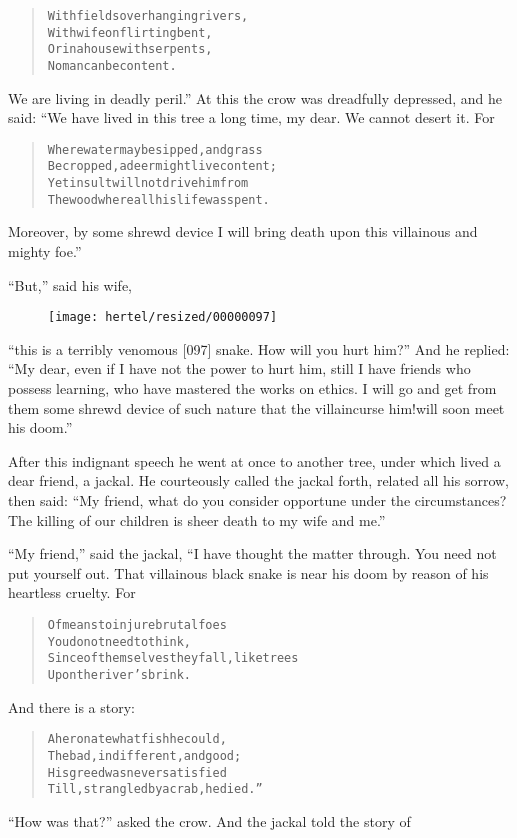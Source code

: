 \documentclass[article, twoside, 10pt]{memoir}
\renewenvironment{verbatim}{%
\begin{quote}%
\vskip -10pt%
\begin{alltt}\normalfont\small}{\end{alltt}%
\end{quote}%
\vskip -10pt
} %
\begin{document}
\begin{verbatim}
With fields overhanging rivers,
    With wife on flirting bent,
Or in a house with serpents,
    No man can be content.
\end{verbatim}
We are living in deadly peril.” At this the crow was dreadfully
depressed, and he said: “We have lived in this tree a long time, my
dear. We cannot desert it. For

\begin{verbatim}
Where water may be sipped, and grass
    Be cropped, a deer might live content;
Yet insult will not drive him from
    The wood where all his life was spent.
\end{verbatim}
Moreover, by some shrewd device I will bring death upon this
villainous and mighty foe.”

``But,'' said his wife,
\begin{figure}[p]\texttt{[image: hertel/resized/00000097]}\end{figure}``this is a terribly venomous [097] snake. How will you hurt him?''
And he replied:
``My dear, even if I have not the power to hurt him, still I have friends who possess learning, who have mastered the works on ethics. I will go and get from them some shrewd device of such nature that the villain{\textemdash}curse him!{\textemdash}will soon meet his doom.''

After this indignant speech he went at once to another tree, under
which lived a dear friend, a jackal. He courteously called the
jackal forth, related all his sorrow, then said:
``My friend, what do you consider opportune under the circumstances? The killing of our children is sheer death to my wife and me.''

``My friend,'' said the jackal, “I have thought the matter through.
You need not put yourself out. That villainous black snake is near
his doom by reason of his heartless cruelty. For

\begin{verbatim}
Of means to injure brutal foes
    You do not need to think,
Since of themselves they fall, like trees
    Upon the river's brink.
\end{verbatim}
And there is a story:

\begin{verbatim}
A heron ate what fish he could,
The bad, indifferent, and good;
His greed was never satisfied
Till, strangled by a crab, he died.”
\end{verbatim}
``How was that?'' asked the crow. And the jackal told the story of
\end{document}

